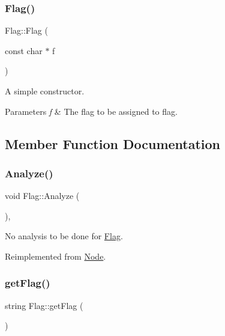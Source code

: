 \subsubsection{\texorpdfstring{Flag()}{Flag()}}
{\footnotesize\ttfamily Flag\+::\+Flag (\begin{DoxyParamCaption}\item[{const char $\ast$}]{f }\end{DoxyParamCaption})}

A simple constructor. 
\begin{DoxyParams}{Parameters}
{\em f} & The flag to be assigned to flag. \\
\hline
\end{DoxyParams}


\subsection{Member Function Documentation}
\mbox{\label{class_flag_ae09e99101902e5486e9d5712749623b3}} 
\subsubsection{\texorpdfstring{Analyze()}{Analyze()}}
{\footnotesize\ttfamily void Flag\+::\+Analyze (\begin{DoxyParamCaption}{ }\end{DoxyParamCaption})\hspace{0.3cm}{\ttfamily [inline]}, {\ttfamily [virtual]}}

No analysis to be done for \hyperlink{class_flag}{Flag}. 

Reimplemented from \hyperlink{class_node_a5f88d55c6f253a29def7ccc443d83d47}{Node}.

\mbox{\label{class_flag_a06f1c9c6b30ad492a14c8311c6276159}} 
\subsubsection{\texorpdfstring{get\+Flag()}{getFlag()}}
{\footnotesize\ttfamily string Flag\+::get\+Flag (\begin{DoxyParamCaption}{ }\end{DoxyParamCaption})\hspace{0.3cm}{\ttfamily [inline]}}

